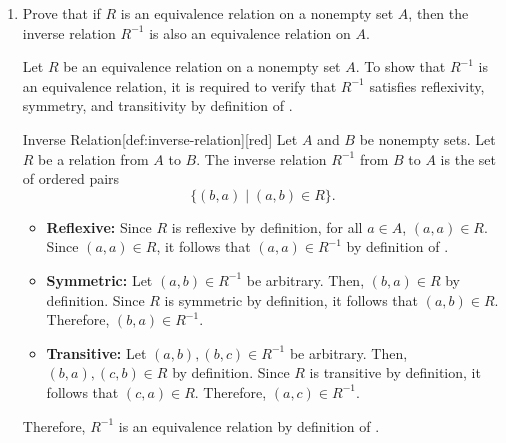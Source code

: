 \begin{enumerate}
  








  \item Prove that if $R$ is an equivalence relation on a nonempty set $A$, then 
  the inverse relation $R^{-1}$ is also an equivalence relation on $A$.
  \begin{subprove}
    Let $R$ be an equivalence relation on a nonempty set $A$. 
    To show that $R^{-1}$ is an equivalence relation, it is required to 
    verify that $R^{-1}$ satisfies reflexivity, symmetry, and 
    transitivity by definition of .  
    \begin{define}{Inverse Relation}[def:inverse-relation][red]
      Let $A$ and $B$ be nonempty sets. Let $R$ be a 
      relation from $A$ to $B$. The inverse relation $R^{-1}$ 
      from $B$ to $A$ is the set of ordered pairs 
      $$
      \{(b, a) \mid(a, b) \in R\}.
      $$
    \end{define}
    \begin{itemize}
      \item \textbf{Reflexive:} Since $R$ is reflexive by definition, for all $a \in A$, $(a,a) \in R$. 
      Since $(a,a) \in R$, it follows that $(a,a) \in R^{-1}$ by definition of .
      \item \textbf{Symmetric:} Let $(a,b) \in R^{-1}$ be arbitrary. Then, $(b,a) \in R$ by definition. 
      Since $R$ is symmetric by definition, it follows that $(a,b) \in R$. 
      Therefore, $(b,a) \in R^{-1}$.
      \item \textbf{Transitive:} Let $(a,b), (b,c) \in R^{-1}$ be arbitrary. Then, $(b,a), (c,b) \in R$ by definition. 
      Since $R$ is transitive by definition, it follows that $(c,a) \in R$. 
      Therefore, $(a,c) \in R^{-1}$.
    \end{itemize}
    Therefore, $R^{-1}$ is an equivalence relation by definition of .
  \end{subprove}





  

  \newpage


\end{enumerate}
